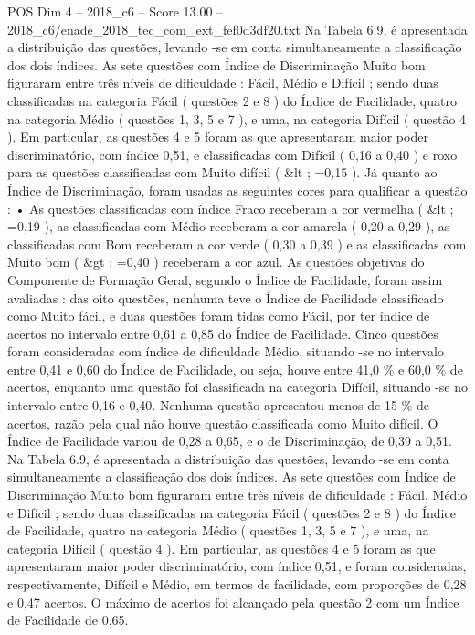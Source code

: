 \begin{textsample}{POS Dim 4 – 2018\_c6 – Score 13.00 – 2018\_c6/enade\_2018\_tec\_com\_ext\_fef0d3df20.txt}
Na Tabela 6.9, é apresentada a distribuição das questões, levando -se em conta simultaneamente a classificação dos dois índices.
As sete questões com Índice de Discriminação Muito bom figuraram entre três níveis de dificuldade : Fácil, Médio e Difícil ; sendo duas classificadas na categoria Fácil ( questões 2 e 8 ) do Índice de Facilidade, quatro na categoria Médio ( questões 1, 3, 5 e 7 ), e uma, na categoria Difícil ( questão 4 ).
Em particular, as questões 4 e 5 foram as que apresentaram maior poder discriminatório, com índice 0,51, e classificadas com Difícil ( 0,16 a 0,40 ) e roxo para as questões classificadas com Muito difícil ( \&lt ; =0,15 ).
Já quanto ao Índice de Discriminação, foram usadas as seguintes cores para qualificar a questão : • As questões classificadas com índice Fraco receberam a cor vermelha ( \&lt ; =0,19 ), as classificadas com Médio receberam a cor amarela ( 0,20 a 0,29 ), as classificadas com Bom receberam a cor verde ( 0,30 a 0,39 ) e as classificadas com Muito bom ( \&gt ; =0,40 ) receberam a cor azul.
As questões objetivas do Componente de Formação Geral, segundo o Índice de Facilidade, foram assim avaliadas : das oito questões, nenhuma teve o Índice de Facilidade classificado como Muito fácil, e duas questões foram tidas como Fácil, por ter índice de acertos no intervalo entre 0,61 a 0,85 do Índice de Facilidade.
Cinco questões foram consideradas com índice de dificuldade Médio, situando -se no intervalo entre 0,41 e 0,60 do Índice de Facilidade, ou seja, houve entre 41,0 \% e 60,0 \% de acertos, enquanto uma questão foi classificada na categoria Difícil, situando -se no intervalo entre 0,16 e 0,40.
Nenhuma questão apresentou menos de 15 \% de acertos, razão pela qual não houve questão classificada como Muito difícil.
O Índice de Facilidade variou de 0,28 a 0,65, e o de Discriminação, de 0,39 a 0,51.
Na Tabela 6.9, é apresentada a distribuição das questões, levando -se em conta simultaneamente a classificação dos dois índices.
As sete questões com Índice de Discriminação Muito bom figuraram entre três níveis de dificuldade : Fácil, Médio e Difícil ; sendo duas classificadas na categoria Fácil ( questões 2 e 8 ) do Índice de Facilidade, quatro na categoria Médio ( questões 1, 3, 5 e 7 ), e uma, na categoria Difícil ( questão 4 ).
Em particular, as questões 4 e 5 foram as que apresentaram maior poder discriminatório, com índice 0,51, e foram consideradas, respectivamente, Difícil e Médio, em termos de facilidade, com proporções de 0,28 e 0,47 acertos.
O máximo de acertos foi alcançado pela questão 2 com um Índice de Facilidade de 0,65.

\end{textsample}
